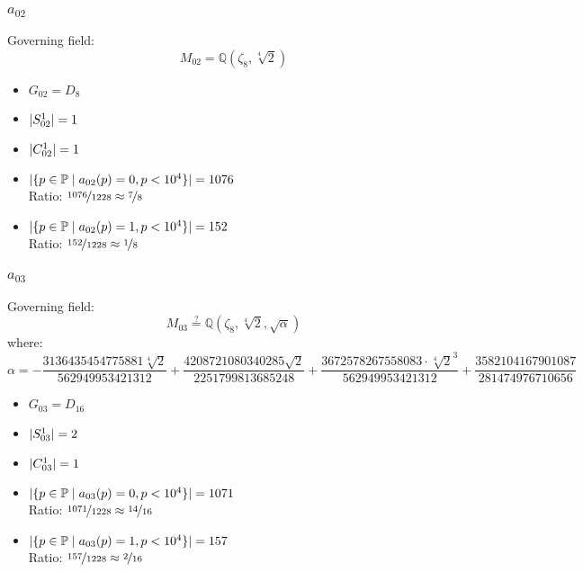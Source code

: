 \subsubsection{$a_{02}$}
Governing field:
$$M_{02} = \mathbb{Q}\left(\zeta_8, \sqrt[4]{2}\right)$$
\begin{multicols}{2}
	\begin{itemize}
		\item $G_{02} = D_8$
		\item $| S_{02}^1 | = 1$
		\item $| C_{02}^1 | = 1$
	\end{itemize}
	\begin{itemize}
		\item $| \{ p \in \mathbb{P} \mid a_{02}(p)=0, p<10^4 \} | = 1076$\\
		Ratio: $\nicefrac{ 1076 }{ 1228 } \approx \nicefrac{ 7 }{ 8 }$
		\item $| \{ p \in \mathbb{P} \mid a_{02}(p)=1, p<10^4 \} | = 152$\\
		Ratio: $\nicefrac{ 152 }{ 1228 } \approx \nicefrac{ 1 }{ 8 }$
	\end{itemize}
\end{multicols}

\subsubsection{$a_{03}$}
Governing field:
$$M_{03} \stackrel{?}{=} \mathbb{Q}\left(\zeta_8, \sqrt[4]{2}, \sqrt{\alpha}\right)$$
where:
$$\alpha = - \frac{3136435454775881 \sqrt[4]{2}}{562949953421312} + \frac{4208721080340285 \sqrt{2}}{2251799813685248} + \frac{3672578267558083 \cdot \sqrt[4]{2}^3}{562949953421312} + \frac{3582104167901087}{281474976710656}$$
\begin{multicols}{2}
	\begin{itemize}
		\item $G_{03} = D_{16}$
		\item $| S_{03}^1 | = 2$
		\item $| C_{03}^1 | = 1$
	\end{itemize}
	\begin{itemize}
		\item $| \{ p \in \mathbb{P} \mid a_{03}(p)=0, p<10^4 \} | = 1071$\\
		Ratio: $\nicefrac{ 1071 }{ 1228 } \approx \nicefrac{ 14 }{ 16 }$
		\item $| \{ p \in \mathbb{P} \mid a_{03}(p)=1, p<10^4 \} | = 157$\\
		Ratio: $\nicefrac{ 157 }{ 1228 } \approx \nicefrac{ 2 }{ 16 }$
	\end{itemize}
\end{multicols}

